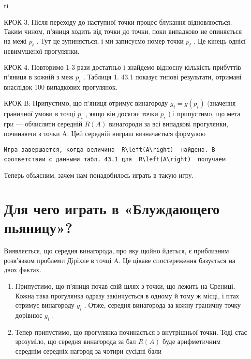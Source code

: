 \documentclass[
  ukrainian,
]{article}
\begin{document}
ti

КРОК 3. Після переходу до наступної точки процес блукання відновлюється.
Таким чином, п'яниця ходить від точки до точки, поки випадково не
опиняється на межі \(p_t\) . Тут це зупиняється, і ми записуємо номер
точки \(p_t\) . Це кінець однієї невимушеної прогулянки.

КРОК 4. Повторимо 1-3 рази достатньо і знайдемо відносну кількість
прибуттів п'яниця в кожній з меж \(p_i\) . Таблиця 1. 43.1 показує
типові результати, отримані внаслідок 100 випадкових прогулянок.

КРОК B: Припустимо, що п'яниця отримує винагороду
\(g_i = g\left(p_i\right)\) (значення граничної умови в точці \(p_i\) ,
якщо він досягає точки \(p_i\) ) і припустимо, що мета гри --- обчислити
середній \(R\left(A\right)\) винагороди за всі випадкові прогулянки,
починаючи з точки A. Цей середній виграш визначається формулою

\begin{verbatim}
Игра завершается, когда величина  R\left(A\right)  найдена. В соответствии с данными табл. 43.1 для  R\left(A\right)  получаем
\end{verbatim}

Теперь объясним, зачем нам понадобилось играть в такую игру.

\section{Для чего играть в «Блуждающего
пьяницу»?}\label{ux434ux43bux44f-ux447ux435ux433ux43e-ux438ux433ux440ux430ux442ux44c-ux432-ux431ux43bux443ux436ux434ux430ux44eux449ux435ux433ux43e-ux43fux44cux44fux43dux438ux446ux443}

Виявляється, що середня винагорода, про яку щойно йдеться, є приблизним
розв'язком проблеми Діріхле в точці A. Це цікаве спостереження базується
на двох фактах.

\begin{enumerate}
\def\labelenumi{\arabic{enumi}.}
\item
  Припустимо, що п'яниця почав свій шлях з точки, що лежить на Єрениці.
  Кожна така прогулянка одразу закінчується в одному й тому ж місці, і
  птах отримує винагороду \(g_i\) . Отже, середня винагорода за кожну
  граничну точку дорівнює \(g_i\) .
\item
  Тепер припустимо, що прогулянка починається з внутрішньої точки. Тоді
  стає зрозуміло, що середня винагорода за бал \(R(A)\) буде
  арифметичним середнім середніх нагород за чотири сусідні бали
\end{enumerate}
\end{document}
